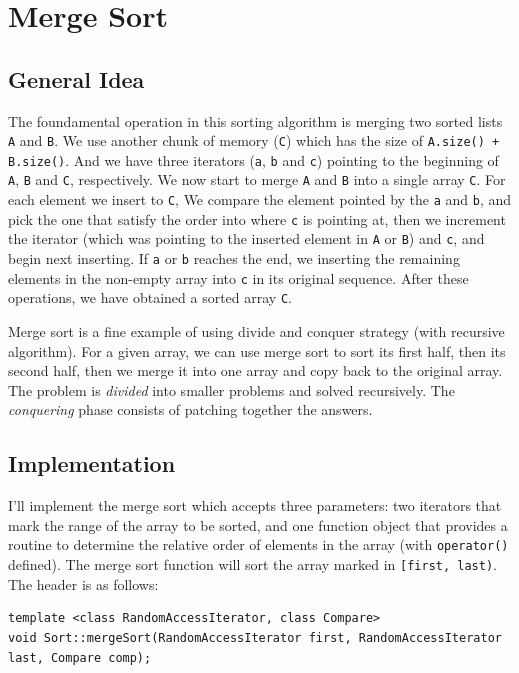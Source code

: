 \documentclass[11pt]{book}
\begin{document}
\chapter{Merge Sort}
\label{sec:org285f93b}
\section{General Idea}
\label{sec:org5dbd4c3}

The foundamental operation in this sorting algorithm is merging two sorted lists \texttt{A} and \texttt{B}. We use another chunk of memory (\texttt{C}) which has the size of \texttt{A.size() + B.size()}. And we have three iterators (\texttt{a}, \texttt{b} and \texttt{c}) pointing to the beginning of \texttt{A}, \texttt{B} and \texttt{C}, respectively. We now start to merge \texttt{A} and \texttt{B} into a single array \texttt{C}. For each element we insert to \texttt{C}, We compare the element pointed by the \texttt{a} and \texttt{b}, and pick the one that satisfy the order into where \texttt{c} is pointing at, then we increment the iterator (which was pointing to the inserted element in \texttt{A} or \texttt{B}) and \texttt{c}, and begin next inserting. If \texttt{a} or \texttt{b} reaches the end, we inserting the remaining elements in the non-empty array into \texttt{c} in its original sequence. After these operations, we have obtained a sorted array \texttt{C}.

Merge sort is a fine example of using divide and conquer strategy (with recursive algorithm). For a given array, we can use merge sort to sort its first half, then its second half, then we merge it into one array and copy back to the original array. The problem is \emph{divided} into smaller problems and solved recursively. The \emph{conquering} phase consists of patching together the answers.
\section{Implementation}
\label{sec:org37c6437}

I'll implement the merge sort which accepts three parameters: two iterators that mark the range of the array to be sorted, and one function object that provides a routine to determine the relative order of elements in the array (with \texttt{operator()} defined). The merge sort function will sort the array marked in \texttt{[first, last)}. The header is as follows:
\begin{verbatim}
template <class RandomAccessIterator, class Compare>
void Sort::mergeSort(RandomAccessIterator first, RandomAccessIterator last, Compare comp);
\end{verbatim}
\end{document}
